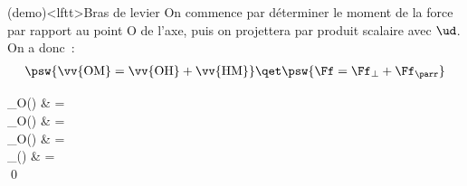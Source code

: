 \documentclass[../../main/main.tex]{subfiles}
\begin{document}
\begin{tcb*}(demo)<lftt>{Bras de levier}
	On commence par déterminer le moment de la force par rapport au point O de
	l'axe, puis on projettera par produit scalaire avec $\ud$. On a donc~:
	\begin{gather*}
		\psw{
			\vv{\rm OM} = \vv{\rm OH} + \vv{\rm HM}
		}
		\qet
		\psw{
			\Ff = \Ff_{\perp} + \Ff_{\parr}
		}
	\end{gather*}
	\begin{DispWithArrows*}
		\Mcf_{\rm O}(\Ff)
		& =
		\Arrow{$\Ff = \Ff_{\perp} + \Ff_{\parr}$}
		\\\Lra
		\Mcf_{\rm O}(\Ff)
		& =
		\psw{
			\OM \wedge (\Ff_{\parr} + \Ff_{\perp})
		}
		\\\Lra
		\Mcf_{\rm O}(\Ff)
		& =
		\psw{
			\underbracket[1pt]{\OM \wedge \Ff_{\parr}}_{\perp \ud} +
			\underbracket[1pt]{\OM \wedge \Ff_{\perp}}_{\parr \ud}
		}
		\CArrow{$\cdot \ud$}
		\\\Ra
		\Mc_{\D}(\Ff)
		& =
		\\\Lra
		\qed
	\end{DispWithArrows*}
\end{tcb*}
\end{document}
